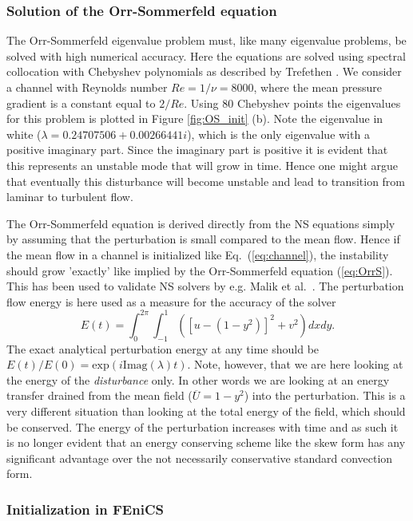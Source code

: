 \subsubsection{Solution of the Orr-Sommerfeld equation}

The Orr-Sommerfeld eigenvalue problem must, like many eigenvalue problems, be solved with high numerical accuracy. Here the equations are solved using spectral collocation with Chebyshev polynomials as described by Trefethen \cite{tref06}. We consider a channel with Reynolds number $Re=1/\nu=8000$, where the mean pressure gradient is a constant equal to $2/Re$. Using 80 Chebyshev points the eigenvalues for this problem is plotted in Figure \ref{fig:OS_init} (b). Note the eigenvalue in white ($\lambda = 0.24707506+0.00266441 i$), which is the only eigenvalue with a positive imaginary part. Since the imaginary part is positive it is evident that this represents an unstable mode that will grow in time. Hence one might argue that eventually this disturbance will become unstable and lead to transition from laminar to turbulent flow.

The Orr-Sommerfeld equation is derived directly from the NS equations simply by assuming that the perturbation is small compared to the mean flow. Hence if the mean flow in a channel is initialized like Eq.~(\ref{eq:channel}), the instability should grow 'exactly' like implied by the Orr-Sommerfeld equation (\ref{eq:OrrS}). This has been used to validate NS solvers by e.g. Malik et al.~\cite{Malik1984}. The perturbation flow energy is here used as a measure for the accuracy of the solver
\begin{equation}
  E(t)= \int_0^{2\pi}\int_{-1}^{1} \left( \left[u-(1-y^2)\right]^2 + v^2 \right) dx dy.
\end{equation}
The exact analytical perturbation energy at any time should be $E(t)/E(0)=\text{exp}(i \text{Imag}(\lambda) t)$. Note, however, that we are here looking at the energy of the \textit{disturbance} only. In other words we are looking at an energy transfer drained from the mean field ($\overline{U}=1-y^2$) into the perturbation. This is a very different situation than looking at the total energy of the field, which should be conserved. The energy of the perturbation increases with time and as such it is no longer evident that an energy conserving scheme like the skew form has any significant advantage over the not necessarily conservative standard convection form.

\subsubsection{Initialization in FEniCS}

